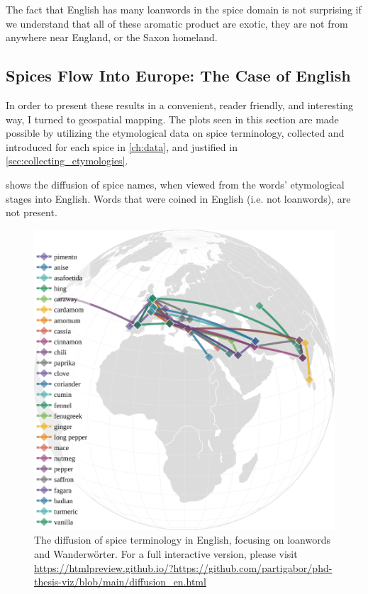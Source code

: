 The fact that English has many loanwords in the spice domain is not surprising if we understand that all of these aromatic product are exotic, they are not from anywhere near England, or the Saxon homeland.




\subsection{Spices Flow Into Europe: The Case of English}

In order to present these results in a convenient, reader friendly, and interesting way, I turned to geospatial mapping. The plots seen in this section are made possible by utilizing the etymological data on spice terminology, collected and introduced for each spice in \cref{ch:data}, and justified in \cref{sec:collecting_etymologies}.

 shows the diffusion of spice names, when viewed from the words' etymological stages into English. Words that were coined in English (i.e. not loanwords), are not present.  

\begin{figure}[ht!]
    \includegraphics[width=\linewidth]{imgs/plots/diffusion_en.pdf}
    \caption{The diffusion of spice terminology in English, focusing on loanwords and Wanderwörter. For a full interactive version, please visit \url{https://htmlpreview.github.io/?https://github.com/partigabor/phd-thesis-viz/blob/main/diffusion_en.html}}
    \label{fig:diffusion_en}
\end{figure}

